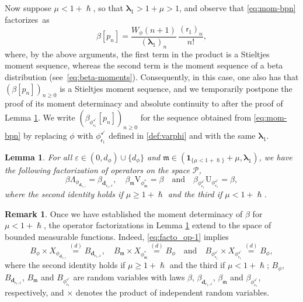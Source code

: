 \documentclass[JEP,XML,SOM,Unicode]{cedram}
\let\epsilon\varepsilon
\theoremstyle{plain}
\newtheorem{lemma}[theorem]{Lemma}
\theoremstyle{definition}
\newtheorem{remark}[theorem]{Remark}
\newcommand{\Poly}{\mathscr{P}}
\newcommand{\m}{\mathfrak{m}}
\newcommand{\dpt}{\bm{d}_{\vat,\epsilon}}
\newcommand{\dz}{{\bm{d}}_{1,\epsilon}}
\newcommand{\lam}{{\bm{\lambda}_1}}
\newcommand{\vat}{{\mathsf{r}_1}}
\newcommand{\phm}{{\phi_\m^*}}
\renewcommand{\varphi}{{\phi_{\vat}^{\checkmark}}}
\newcommand{\gab}[1][\lam,\mo]{{\beta_{#1}}}
\let\h\hslash
\let\mo\mu
\let\bpsi\beta
\begin{document}
Now suppose $\mo\!<\!1+\h$, so that $\lam\!>\!1+\mo\!>\!1$, and observe that \eqref{eq:mom-bpn} factorizes~as
\begin{equation*}
\bpsi [p_n] = \frac{W_{\phi}(n+1)}{(\lam)_n}\, \frac{(\vat)_n}{n!},
\end{equation*}
where, by the above arguments, the first term in the product is a Stieltjes moment sequence, whereas the second term is the moment sequence of a beta distribution (see~\eqref{eq:beta-moments}). Consequently, in this case, one also has that $(\bpsi [p_n])_{n \geq 0}$ is a Stieltjes moment sequence, and we temporarily postpone the proof of its moment determinacy and absolute continuity to after the proof of Lemma \ref{lem:fact}. We write $(\bpsi_\varphi [p_n])_{n \geq 0}$ for the sequence obtained from \eqref{eq:mom-bpn} by replacing $\phi$ with $\varphi$ defined in \eqref{def:varphi} and with the same $\lam$.

\begin{lemma}
\label{lem:fact}
For all $\epsilon \in (0,d_\phi) \cup \{d_\phi\}$ and $\m \in (\bm{1}_{\{\mo < 1+\h\}} + \mo, \lam)$,
we have the following factorization of operators on the space $\Poly$,
\begin{equation}
\label{eq:facto_op-1}
\bpsi \Lambda_{\phi_{\dz}} = \gab[\dpt], \quad \gab[\m] \mathrm{V}_{\phm} = \bpsi \quad \text{and} \quad \bpsi_\varphi \mathrm{U}_\varphi = \bpsi,
\end{equation}
where the second identity holds if $\mo \geq 1+\h$ and the third if $\mo < 1+\h$.
\end{lemma}

\begin{remark}
\label{rem:facto}
Once we have established the moment determinacy of $\bpsi$ for $\mo < 1+\h$, the operator factorizations in
Lemma \ref{lem:fact} extend to the space of bounded measurable functions. Indeed, \eqref{eq:facto_op-1} implies
\begin{equation*}
B_\phi \times X_{\phi_{\dz}} \stackrel{(d)}{=} B_{\dpt}, \quad B_{\m} \times X_{\phi^*_{\m}} \stackrel{(d)}{=} B_{\phi}
\quad \mbox{and} \quad B_{\varphi} \times X_{\varphi} \stackrel{(d)}{=} B_{\phi},
\end{equation*}
where the second identity holds if $\mo \geq 1+\h$ and the third if $\mo < 1+\h$;
$B_\phi$, $B_{\dpt}$, $B_{\m}$ and $B_{\varphi}$ are random variables with laws
$\bpsi$, $\gab[\dpt]$, $\beta_{\m}$ and $\beta_{\varphi}$, respectively, and $\times$ denotes the
product of independent random variables.
\end{remark}
\end{document}
